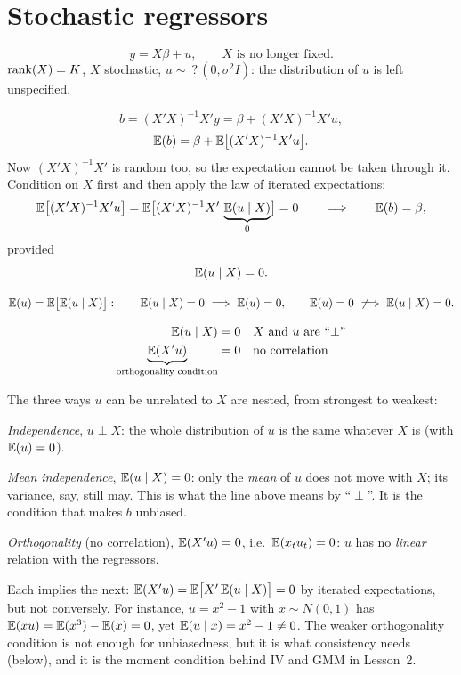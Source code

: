 \documentclass[11pt]{article}
\begin{document}
\section{Stochastic regressors}

\[ y = X\beta + u, \qquad X \text{ is no longer fixed}. \]
$\operatorname{rank}(X) = K$, $X$ stochastic, $u \sim\ ?\,(0, \sigma^{2}I)$: the distribution of $u$ is
left unspecified.

\[ b = (X'X)^{-1}X'y = \beta + (X'X)^{-1}X'u, \]
\[ \mathbb{E}(b) = \beta + \mathbb{E}\bigl[(X'X)^{-1}X'u\bigr]. \]
Now $(X'X)^{-1}X'$ is random too, so the expectation cannot be taken through it.
Condition on $X$ first and then apply the law of iterated expectations:
\[ \mathbb{E}\bigl[(X'X)^{-1}X'u\bigr] = \mathbb{E}\bigl[(X'X)^{-1}X'\,\underbrace{\mathbb{E}(u\mid X)}_{0}\bigr] = 0
   \qquad\Longrightarrow\qquad \mathbb{E}(b) = \beta, \]
provided
\[ \mathbb{E}(u \mid X) = 0. \]

\[ \mathbb{E}(u) = \mathbb{E}\bigl[\mathbb{E}(u\mid X)\bigr]: \qquad
   \mathbb{E}(u\mid X) = 0 \ \Longrightarrow\ \mathbb{E}(u) = 0, \qquad
   \mathbb{E}(u) = 0 \ \not\Longrightarrow\ \mathbb{E}(u\mid X) = 0. \]

\begin{align*}
  \mathbb{E}(u\mid X) &= 0 && \text{$X$ and $u$ are ``$\perp$''}\\
  \underbrace{\mathbb{E}(X'u)}_{\text{orthogonality condition}} &= 0 && \text{no correlation}
\end{align*}

 The three ways $u$ can be unrelated to $X$ are nested, from
strongest to weakest:
\begin{flatlist}
  \item \emph{Independence}, $u \perp X$: the whole distribution of $u$ is the same
        whatever $X$ is (with $\mathbb{E}(u) = 0$).
  \item \emph{Mean independence}, $\mathbb{E}(u\mid X) = 0$: only the \emph{mean} of $u$ does
        not move with $X$; its variance, say, still may. This is what the line above
        means by ``$\perp$''. It is the condition that makes $b$ unbiased.
  \item \emph{Orthogonality} (no correlation), $\mathbb{E}(X'u) = 0$, i.e.\
        $\mathbb{E}(x_{t}u_{t}) = 0$: $u$ has no \emph{linear} relation with the regressors.
\end{flatlist}
Each implies the next: $\mathbb{E}(X'u) = \mathbb{E}\bigl[X'\,\mathbb{E}(u\mid X)\bigr] = 0$ by iterated
expectations, but not conversely. For instance, $u = x^{2} - 1$ with
$x \sim N(0,1)$ has $\mathbb{E}(xu) = \mathbb{E}(x^{3}) - \mathbb{E}(x) = 0$, yet $\mathbb{E}(u\mid x) = x^{2} - 1 \neq 0$.
The weaker orthogonality condition is not enough for unbiasedness, but it is what
consistency needs (below), and it is the moment condition behind IV and GMM in
Lesson~2.
\end{document}
